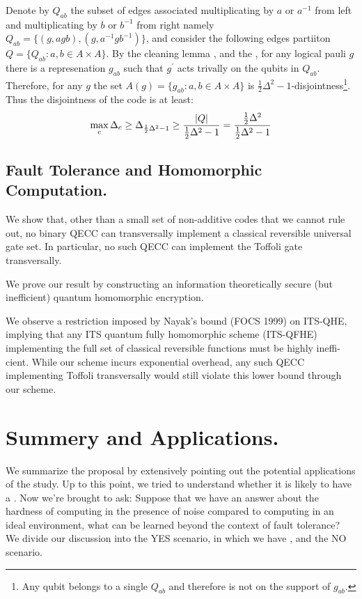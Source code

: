 \documentclass[manuscript,screen,review]{acmart}
\begin{document}
{\begin{enumerate}
  Denote by $Q_{ab}$ the subset of edges associated multiplicating by $a$ or $a^{-1}$ from left and multiplicating by $b$ or $b^{-1}$ from right namely $ Q_{ab} =  \{ (g, agb), (g, a^{-1}gb^{-1}) \} $, and consider the following edges partiiton $Q = \{ Q_{ab} : a,b \in A\times A \}$. By the cleaning lemma \cite{Bravyi_2009}\cite{cleaning_lemm_2}, and the , for any logical pauli $g$ there is a represenation $g_{ab}$ such that $g^{\prime}$ acts trivally on the qubits in $Q_{ab}$. Therefore, for any $g$ the set $ A(g) = \{ g_{ab} : a,b \in A \times A \}$  is $ \frac{1}{2}\Delta^{2}-1$-disjointness\footnote{Any qubit belongs to a single $Q_{ab}$ and therefore is not on the support of $g_{ab}$.}. Thus the disjointness of the code is at least: 
  \begin{equation*}
    \begin{split}
      \max_{c} \Delta_{c} \ge \Delta_{\frac{1}{2} \Delta^{2} - 1 } \ge \frac{  |Q|   }{\frac{1}{2} \Delta^{2} - 1  } = \frac{ \frac{1}{2} \Delta^{2} }{\frac{1}{2} \Delta^{2} - 1 }
    \end{split}
  \end{equation*} 

\end{enumerate}


\subsection{Fault Tolerance and Homomorphic Computation.  }

 We show that, other than a small set of non-additive codes that we cannot rule out, no binary QECC can transversally implement a classical reversible universal gate set. In particular, no such QECC can implement the Toffoli gate transversally.

 We prove our result by constructing an information theoretically secure (but inefficient) quantum homomorphic encryption.

We observe a restriction imposed by Nayak’s bound (FOCS 1999) on ITS-QHE, implying that any ITS quantum fully homomorphic scheme (ITS-QFHE) implementing the full set of classical reversible functions must be highly ineffi- cient. While our scheme incurs exponential overhead, any such QECC implementing Toffoli transversally would still violate this lower bound through our scheme.
\cite{ newman2017limitationstransversalcomputationquantum}


  \section {Summery and Applications.} \label{sec:app}
  We summarize the proposal by extensively pointing out the potential applications of the study. Up to this point, we tried to understand whether it is likely to have a \CDO . Now we're brought to ask: Suppose that we have an answer about the hardness of computing in the presence of noise compared to computing in an ideal environment, what can be learned beyond the context of fault tolerance? We divide our discussion into the YES scenario, in which we have \CDO, and the NO scenario. 

}
\end{document}

